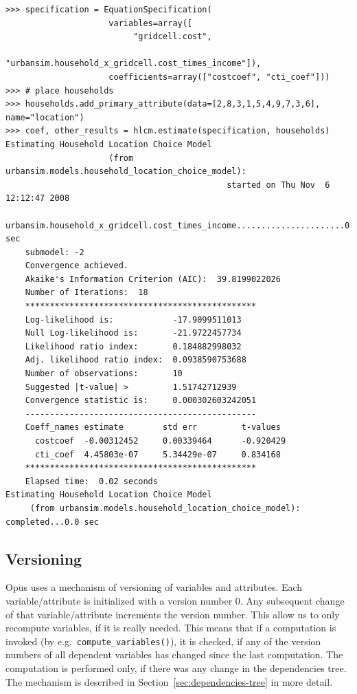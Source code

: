 \begin{verbatim}
>>> specification = EquationSpecification(
                     variables=array([
                          "gridcell.cost",
                          "urbansim.household_x_gridcell.cost_times_income"]),
                     coefficients=array(["costcoef", "cti_coef"]))
>>> # place households
>>> households.add_primary_attribute(data=[2,8,3,1,5,4,9,7,3,6], name="location")
>>> coef, other_results = hlcm.estimate(specification, households)
Estimating Household Location Choice Model 
                     (from urbansim.models.household_location_choice_model): 
                                             started on Thu Nov  6 12:12:47 2008
    urbansim.household_x_gridcell.cost_times_income......................0.0 sec
    submodel: -2
    Convergence achieved.
    Akaike's Information Criterion (AIC):  39.8199022026
    Number of Iterations:  18
    ***********************************************
    Log-likelihood is:            -17.9099511013
    Null Log-likelihood is:       -21.9722457734
    Likelihood ratio index:       0.184882998032
    Adj. likelihood ratio index:  0.0938590753688
    Number of observations:       10
    Suggested |t-value| >         1.51742712939
    Convergence statistic is:     0.000302603242051
    -----------------------------------------------
    Coeff_names estimate        std err         t-values
      costcoef  -0.00312452     0.00339464      -0.920429
      cti_coef  4.45803e-07     5.34429e-07     0.834168
    ***********************************************
    Elapsed time:  0.02 seconds
Estimating Household Location Choice Model 
     (from urbansim.models.household_location_choice_model): completed...0.0 sec
\end{verbatim}

\label{page:iv-spec}

%
\subsection{Versioning}
\label{sec:versioning}
%
Opus uses a mechanism of versioning of variables and attributes. Each
variable/attribute  is initialized with a version number 0. Any subsequent
change of that variable/attribute  increments the version number. This allow us
to only recompute variables, if it is really needed. This means that if a
computation is invoked (by e.g.\ \verb|compute_variables()|), it is checked, if
any of the version numbers of all dependent variables has changed since the
last computation. The computation is performed only, if there was any change
in the dependencies tree. The mechanism is described in Section~\ref{sec:dependencies-tree}
in more detail.

